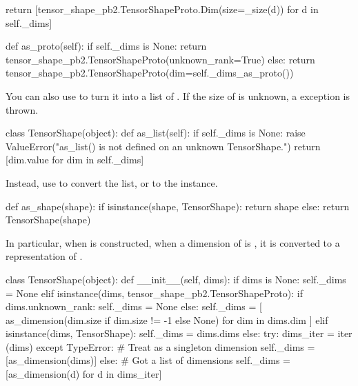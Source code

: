 \begin{content}
\begin{leftbar}
\begin{python}
    return [tensor_shape_pb2.TensorShapeProto.Dim(size=_size(d))
            for d in self._dims]

  def as_proto(self):
    if self._dims is None:
      return tensor_shape_pb2.TensorShapeProto(unknown_rank=True)
    else:
      return tensor_shape_pb2.TensorShapeProto(dim=self._dims_as_proto())
\end{python}
\end{leftbar}

You can also use  to turn it into a list of . If the  size of  is unknown, a  exception is thrown.

\begin{leftbar}
\begin{python}
class TensorShape(object):
  def as_list(self):
    if self._dims is None:
      raise ValueError("as_list() is not defined on an unknown TensorShape.")
    return [dim.value for dim in self._dims]
\end{python}
\end{leftbar}

Instead, use  to convert the  list, or  to the  instance.

\begin{leftbar}
\begin{python}
def as_shape(shape):
  if isinstance(shape, TensorShape):
    return shape
  else:
    return TensorShape(shape)
\end{python}
\end{leftbar}

In particular, when  is constructed, when a dimension of  is , it is converted to a representation of .

\begin{leftbar}
\begin{python}
class TensorShape(object):
  def __init__(self, dims):
    if dims is None:
      self._dims = None
    elif isinstance(dims, tensor_shape_pb2.TensorShapeProto):
      if dims.unknown_rank:
        self._dims = None
      else:
        self._dims = [
          as_dimension(dim.size if dim.size != -1 else None)
          for dim in dims.dim
        ]
    elif isinstance(dims, TensorShape):
      self._dims = dims.dims
    else:
      try:
        dims_iter = iter (dims)
      except TypeError:
        # Treat as a singleton dimension
        self._dims = [as_dimension(dims)]
      else:
        # Got a list of dimensions
        self._dims = [as_dimension(d) for d in dims_iter]
\end{python}
\end{leftbar}



\end{content}
